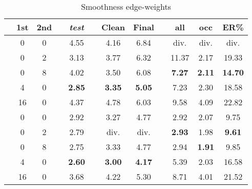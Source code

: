 \documentclass[runningheads]{llncs}
\begin{document}
\begin{wraptable}{r}{0.45\columnwidth}
{\begin{tabular}{lccccccccccc}
    \cmidrule{5-5} \cmidrule{7-8} \cmidrule{10-12} 
    &1st & 2nd && \textit{test} && Clean & Final && all & occ & ER\%\\
    \midrule
    \parbox[t]{2mm}{}
    & 0 & 0 && 4.55 && 4.16 & 6.84 && div. & div. & div. \\
    & 0 & 2 && 3.13 && 3.77 & 6.32 && 11.37 & 2.17 & 19.33 \\
    & 0 & 8 && 4.02 && 3.50 & 6.08 && {\bf 7.27} & {\bf 2.11} & {\bf 14.70} \\
    & 4 & 0 && {\bf 2.85} && {\bf 3.35} & {\bf 5.05} && 7.23 & 2.30 & 18.58 \\
    & 16 & 0 && 4.37 && 4.78 & 6.03 && 9.58 & 4.09 & 22.82 \\
    \hline
    \parbox[t]{2mm}{} 
    & 0 & 0 && 2.92 && 3.27 & 4.77 && 2.92 & 2.07 & 9.75 \\
    & 0 & 2 && 2.79 && div. & div. && {\bf 2.93} & 1.98 & {\bf 9.61} \\
    & 0 & 8 && 2.75 && 3.33 & 4.77 && 2.94 & {\bf 1.91} & 9.85 \\
    & 4 & 0 && {\bf 2.60} && {\bf 3.00} & {\bf 4.17} && 5.39 & 2.03 & 16.58 \\
    & 16 & 0 && 3.68 && 4.22 & 5.30 && 8.71 & 4.01 & 21.52 \\
    \bottomrule
    \end{tabular}}
    \caption{Smoothness edge-weights}
    \label{table:smoothness_edge}
\end{wraptable}
\end{document}
